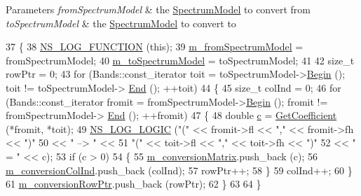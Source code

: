 \begin{DoxyParams}{Parameters}
{\em from\+Spectrum\+Model} & the \hyperlink{classns3_1_1SpectrumModel}{Spectrum\+Model} to convert from \\
\hline
{\em to\+Spectrum\+Model} & the \hyperlink{classns3_1_1SpectrumModel}{Spectrum\+Model} to convert to \\
\hline
\end{DoxyParams}

\begin{DoxyCode}
37 \{
38   \hyperlink{log-macros-disabled_8h_a90b90d5bad1f39cb1b64923ea94c0761}{NS\_LOG\_FUNCTION} (\textcolor{keyword}{this});
39   \hyperlink{classns3_1_1SpectrumConverter_a152eb969ac726014de6563397bee9fc7}{m\_fromSpectrumModel} = fromSpectrumModel;
40   \hyperlink{classns3_1_1SpectrumConverter_aa99d9ccf13de156a7691b5c12e34a3dc}{m\_toSpectrumModel} = toSpectrumModel;
41 
42   \textcolor{keywordtype}{size\_t} rowPtr = 0;
43   \textcolor{keywordflow}{for} (Bands::const\_iterator toit = toSpectrumModel->\hyperlink{classns3_1_1SpectrumModel_a41b34bec2d882bb573849dad7237b10d}{Begin} (); toit != toSpectrumModel->
      \hyperlink{classns3_1_1SpectrumModel_ac1c60822fc8fd0463905ac908df1e8b4}{End} (); ++toit)
44     \{
45       \textcolor{keywordtype}{size\_t} colInd = 0;
46       \textcolor{keywordflow}{for} (Bands::const\_iterator fromit = fromSpectrumModel->\hyperlink{classns3_1_1SpectrumModel_a41b34bec2d882bb573849dad7237b10d}{Begin} (); fromit != fromSpectrumModel->
      \hyperlink{classns3_1_1SpectrumModel_ac1c60822fc8fd0463905ac908df1e8b4}{End} (); ++fromit)
47         \{
48           \textcolor{keywordtype}{double} \hyperlink{lte_2model_2fading-traces_2fading__trace__generator_8m_ae0323a9039add2978bf5b49550572c7c}{c} = \hyperlink{classns3_1_1SpectrumConverter_aebdde6358be5ca6824b009f0c54a1dfd}{GetCoefficient} (*fromit, *toit);
49           \hyperlink{group__logging_ga88acd260151caf2db9c0fc84997f45ce}{NS\_LOG\_LOGIC} (\textcolor{stringliteral}{"("} << fromit->fl << \textcolor{stringliteral}{","}  << fromit->fh << \textcolor{stringliteral}{")"}
50                             << \textcolor{stringliteral}{" --> "} <<
51                         \textcolor{stringliteral}{"("} << toit->fl << \textcolor{stringliteral}{","} << toit->fh << \textcolor{stringliteral}{")"}
52                             << \textcolor{stringliteral}{" = "} << c);
53           \textcolor{keywordflow}{if} (c > 0)
54             \{
55               \hyperlink{classns3_1_1SpectrumConverter_a099d906c2994643e9e37b4eeea96f8e8}{m\_conversionMatrix}.push\_back (c);
56               \hyperlink{classns3_1_1SpectrumConverter_af316fdc8ed648d55b46fb7e6f52f7412}{m\_conversionColInd}.push\_back (colInd);
57               rowPtr++;
58             \}
59           colInd++;
60         \}
61       \hyperlink{classns3_1_1SpectrumConverter_ae0fa415f07184df143b9ecfb826eb345}{m\_conversionRowPtr}.push\_back (rowPtr);
62     \}
63 
64 \}
\end{DoxyCode}


